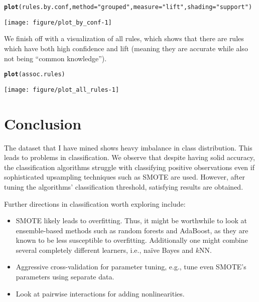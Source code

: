 \documentclass{article}\usepackage[]{graphicx}\usepackage[]{color}
\makeatletter
\def\maxwidth{ %
  \ifdim\Gin@nat@width>\linewidth
    \linewidth
  \else
    \Gin@nat@width
  \fi
}
\newcommand{\hlstr}[1]{\textcolor[rgb]{0.192,0.494,0.8}{#1}}%
\newcommand{\hlstd}[1]{\textcolor[rgb]{0.345,0.345,0.345}{#1}}%
\newcommand{\hlkwc}[1]{\textcolor[rgb]{0.333,0.667,0.333}{#1}}%
\newcommand{\hlkwd}[1]{\textcolor[rgb]{0.737,0.353,0.396}{\textbf{#1}}}%
\newenvironment{kframe}{%
 \def\at@end@of@kframe{}%
 \ifinner\ifhmode%
  \def\at@end@of@kframe{\end{minipage}}%
  \begin{minipage}{\columnwidth}%
 \fi\fi%
 \def\FrameCommand##1{\hskip\@totalleftmargin \hskip-\fboxsep
 \colorbox{shadecolor}{##1}\hskip-\fboxsep
     \hskip-\linewidth \hskip-\@totalleftmargin \hskip\columnwidth}%
 \MakeFramed {\advance\hsize-\width
   \@totalleftmargin\z@ \linewidth\hsize
   \@setminipage}}%
 {\par\unskip\endMakeFramed%
 \at@end@of@kframe}
\newenvironment{knitrout}{}{} %
\makeatother
\begin{document}
\begin{knitrout}
\color{fgcolor}\begin{kframe}
\begin{alltt}
\hlkwd{plot}\hlstd{(rules.by.conf,} \hlkwc{method}\hlstd{=}\hlstr{"grouped"}\hlstd{,} \hlkwc{measure}\hlstd{=}\hlstr{"lift"}\hlstd{,} \hlkwc{shading}\hlstd{=}\hlstr{"support"}\hlstd{)}
\end{alltt}
\end{kframe}

{\centering \texttt{[image: figure/plot\_by\_conf-1]} 

}



\end{knitrout}

We finish off with a visualization of all rules, which shows that there are
rules which have both high confidence and lift (meaning they are accurate while
also not being ``common knowledge'').

\begin{knitrout}
\color{fgcolor}\begin{kframe}
\begin{alltt}
\hlkwd{plot}\hlstd{(assoc.rules)}
\end{alltt}
\end{kframe}

{\centering \texttt{[image: figure/plot\_all\_rules-1]} 

}



\end{knitrout}

\section{Conclusion}

The dataset that I have mined shows heavy imbalance in class distribution.  This
leads to problems in classification.  We observe that despite having solid
accuracy, the classification algorithms struggle with classifying positive
observations even if sophisticated upsampling techniques such as SMOTE are
used.  However, after tuning the algorithms' classification threshold,
satisfying results are obtained.

Further directions in classification worth exploring include:
\begin{itemize}
\item SMOTE likely leads to overfitting.  Thus, it might be worthwhile to look
  at ensemble-based methods such as random forests and AdaBoost, as they are
  known to be less susceptible to overfitting.  Additionally one might combine
  several completely different learners, i.e., naïve Bayes and $k$NN.
\item Aggressive cross-validation for parameter tuning, e.g., tune even SMOTE's
  parameters using separate data.
\item Look at pairwise interactions for adding nonlinearities.
\end{itemize}
\end{document}
